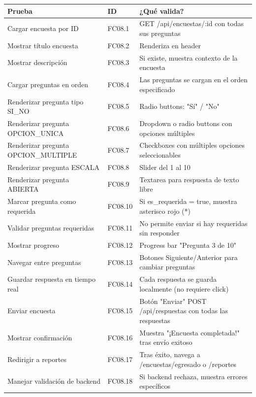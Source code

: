 \begin{table}[H]
\centering
\begin{tabular}{|l|l|p{6cm}|}
\hline
\textbf{Prueba} & \textbf{ID} & \textbf{¿Qué valida?} \\ \hline
Cargar encuesta por ID & FC08.1 & GET /api/encuestas/:id con todas sus preguntas \\ \hline
Mostrar título encuesta & FC08.2 & Renderiza en header \\ \hline
Mostrar descripción & FC08.3 & Si existe, muestra contexto de la encuesta \\ \hline
Cargar preguntas en orden & FC08.4 & Las preguntas se cargan en el orden especificado \\ \hline
Renderizar pregunta tipo SI\_NO & FC08.5 & Radio buttons: "Sí" / "No" \\ \hline
Renderizar pregunta OPCION\_UNICA & FC08.6 & Dropdown o radio buttons con opciones múltiples \\ \hline
Renderizar pregunta OPCION\_MULTIPLE & FC08.7 & Checkboxes con múltiples opciones seleccionables \\ \hline
Renderizar pregunta ESCALA & FC08.8 & Slider del 1 al 10 \\ \hline
Renderizar pregunta ABIERTA & FC08.9 & Textarea para respuesta de texto libre \\ \hline
Marcar pregunta como requerida & FC08.10 & Si es\_requerida = true, muestra asterisco rojo (*) \\ \hline
Validar preguntas requeridas & FC08.11 & No permite enviar si hay requeridas sin responder \\ \hline
Mostrar progreso & FC08.12 & Progress bar "Pregunta 3 de 10" \\ \hline
Navegar entre preguntas & FC08.13 & Botones Siguiente/Anterior para cambiar preguntas \\ \hline
Guardar respuesta en tiempo real & FC08.14 & Cada respuesta se guarda localmente (no requiere click) \\ \hline
Enviar encuesta & FC08.15 & Botón "Enviar" POST /api/respuestas con todas las respuestas \\ \hline
Mostrar confirmación & FC08.16 & Muestra "¡Encuesta completada!" tras envío exitoso \\ \hline
Redirigir a reportes & FC08.17 & Tras éxito, navega a /encuestas/egresado o /reportes \\ \hline
Manejar validación de backend & FC08.18 & Si backend rechaza, muestra errores específicos \\ \hline
\end{tabular}
\end{table}

